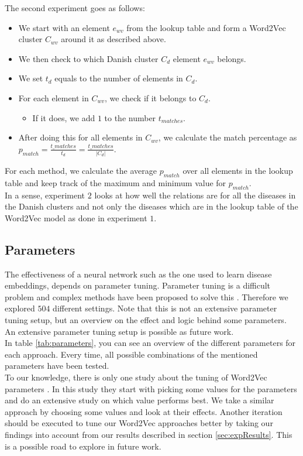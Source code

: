 \noindent The second experiment goes as follows:

\begin{itemize}

\item We start with an element $e_{wv}$ from the lookup table and form a Word2Vec cluster $C_{wv}$ around it as described above.
\item We then check to which Danish cluster $C_d$ element $e_{wv}$ belongs.
\item We set $t_{d}$ equals to the number of elements in $C_d$.
\item For each element in $C_{wv}$, we check if it belongs to $C_d$.
\begin{itemize}
\item If it does, we add $1$ to the number $t_{matches}$.
\end{itemize}
\item After doing this for all elements in $C_{wv}$, we calculate the match percentage as $p_{match} = \frac{t\_{matches}}{t_{d}} = \frac{t\_{matches}}{\left| C_{d} \right|}$.

\end{itemize}

For each method, we calculate the average $p_{match}$ over all elements in the lookup table and keep track of the maximum and minimum value for $p_{match}$. \\

In a sense, experiment $2$ looks at how well the relations are for all the diseases in the Danish clusters and not only the diseases which are in the lookup table of the Word2Vec model as done in experiment $1$.


\subsection{Parameters}
\label{sec:parameters}

The effectiveness of a neural network such as the one used to learn disease embeddings, depends on parameter tuning. Parameter tuning is a difficult problem and complex methods have been proposed to solve this \cite{tuning:article}. Therefore we explored $504$ different settings. Note that this is not an extensive parameter tuning setup, but an overview on the effect and logic behind some parameters. An extensive parameter tuning setup is possible as future work. \\

In table \ref{tab:parameters}, you can see an overview of the different parameters for each approach. Every time, all possible combinations of the mentioned parameters have been tested. \\
To our knowledge, there is only one study about the tuning of Word2Vec parameters \cite{w2vTuning:article}. In this study they start with picking some values for the parameters and do an extensive study on which value performs best. We take a similar approach by choosing some values and look at their effects. Another iteration should be executed to tune our Word2Vec approaches better by taking our findings into account from our results described in section \ref{sec:expResults}. This is a possible road to explore in future work. \\

